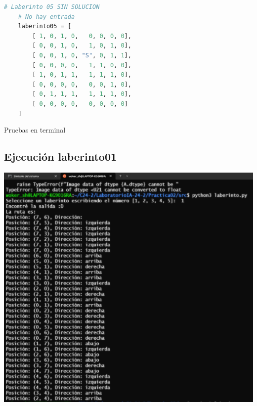 \documentclass[a4paper,12pt]{article}
\begin{document}
\begin{minipage}[t]{8.2cm}
\begin{lstlisting}[style=mystylepython, language=Python, caption= laberinto05]
    # Laberinto 05 SIN SOLUCION
    # No hay entrada
    laberinto05 = [
        [ 1, 0, 1, 0,   0, 0, 0, 0],
        [ 0, 0, 1, 0,   1, 0, 1, 0],
        [ 0, 0, 1, 0, "S", 0, 1, 1],
        [ 0, 0, 0, 0,   1, 1, 0, 0],
        [ 1, 0, 1, 1,   1, 1, 1, 0],
        [ 0, 0, 0, 0,   0, 0, 1, 0],
        [ 0, 1, 1, 1,   1, 1, 1, 0],
        [ 0, 0, 0, 0,   0, 0, 0, 0]
    ]    
\end{lstlisting}
\end{minipage}

\begin{center}
    \Large{Pruebas en terminal}
\end{center}

\subsection*{Ejecución laberinto01}
\begin{center}
    \includegraphics[scale = .5]{IMA/ejecuciones1.png}
\end{center}
\end{document}
